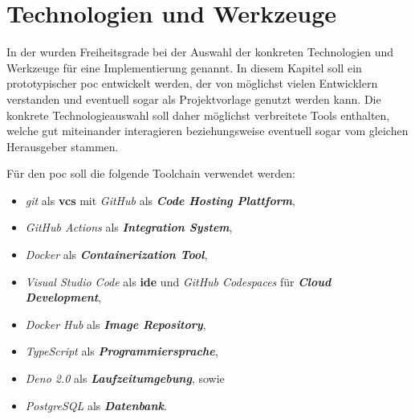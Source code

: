 \section{Technologien und Werkzeuge}
\label{sec:06-01_technologies-and-tools}

In der  wurden Freiheitsgrade bei der Auswahl der konkreten Technologien und Werkzeuge für eine Implementierung genannt. In diesem Kapitel soll ein prototypischer \Gls{poc} entwickelt werden, der von möglichst vielen Entwicklern verstanden und eventuell sogar als Projektvorlage genutzt werden kann. Die konkrete Technologieauswahl soll daher möglichst verbreitete Tools enthalten, welche gut miteinander interagieren beziehungsweise eventuell sogar vom gleichen Herausgeber stammen.

Für den \Gls{poc} soll die folgende Toolchain verwendet werden:

\begin{itemize}
    \item \textit{\Gls{git}} als \textbf{\Gls{vcs}} mit \textit{GitHub} als \textbf{\textit{Code Hosting Plattform}},
    \item \textit{GitHub Actions} als \textbf{\textit{Integration System}},
    \item \textit{Docker} als \textbf{\textit{Containerization Tool}},
    \item \textit{Visual Studio Code} als \textbf{\Gls{ide}} und \textit{GitHub Codespaces} für \textbf{\textit{Cloud Development}},
    \item \textit{Docker Hub} als \textbf{\textit{Image Repository}},
    \item \textit{TypeScript} als \textbf{\textit{Programmiersprache}},
    \item \textit{Deno 2.0} als \textbf{\textit{Laufzeitumgebung}}, sowie
    \item \textit{PostgreSQL} als \textbf{\textit{Datenbank}}.
\end{itemize}

